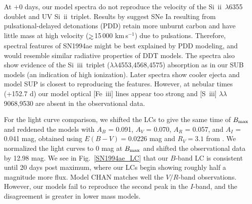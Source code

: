 \documentclass[useAMS,usenatbib,useasmath]{mnras}
\newcommand{\kms}{\hbox{km$\,$s$^{-1}$}}
\def\gtrsim{\mathrel{\hbox{\rlap{\hbox{\lower4pt\hbox{$\sim$}}}\hbox{$>$}}}}
\newcommand{\skii}{\mbox{Si~{\sc ii}}}
\newcommand{\skiii}{\mbox{Si~{\sc iii}}}
\newcommand{\feiii}{\mbox{Fe~{\sc iii}}}
\newcommand{\siii}{\mbox{S~{\sc iii}}}
\newcommand{\lb}{$\lambda$}
\def\fig{Fig.}
\begin{document}
At $+0$ days, our model spectra do not reproduce the velocity of the \skii\ \lb6355 doublet and UV \skii\ triplet. Results by \cite{Dessart2014a} suggest SNe Ia resulting from pulsational-delayed detonations (PDD) retain more unburnt carbon and have little mass at high velocity ($\gtrsim$15\,000 \kms) due to pulsations. Therefore, spectral features of SN1994ae might be best explained by PDD modeling, and would resemble similar radiative properties of DDT models. 
The spectra also show evidence of the \skiii\ triplet (\lb\lb4553,4568,4575) absorption as in our SUB models (an indication of high ionization). Later spectra show cooler ejecta and model SUP is closest to reproducing the features. However, at nebular times (+152.7 d) our model optical [\feiii] lines appear too strong and [\siii] \lb\lb9068,9530 are absent in the observational data. 

For the light curve comparison, we shifted the LCs  to give the same time of $B_{\rm max}$ and reddened the models with $A_B$ = 0.091, $A_V$ = 0.070, $A_R$ = 0.057, and $A_I$ = 0.041 mag, obtained using $E(B-V)=0.0226$ mag and $R_V=3.1$ from \cite{Jha2007}. We normalized the light curves to 0 mag at $B_{\rm max}$ and shifted the observational data by 12.98 mag. We see in \fig~\ref{SN1994ae_LC} that our $B$-band LC is consistent until 20 days post maximum, where our LCs begin showing roughly half a magnitude more flux. Model CHAN matches well the $V/R$-band observations. However, our models fail to reproduce the second peak in the $I$-band, and the disagreement is greater in lower mass models.
\end{document}
